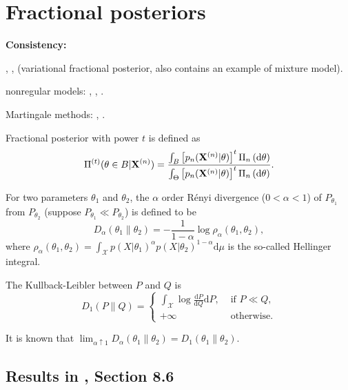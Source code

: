 \documentclass[11pt]{article}
\theoremstyle{plain}
\theoremstyle{definition}
\theoremstyle{remark}
\begin{document}
\section{Fractional posteriors}
\textbf{Consistency:}

\cite{kar10563}, \cite{Bha2016}, \cite{Alquier2017a} (variational fractional posterior, also contains an example of mixture model).

nonregular models: \cite{Ghosal1995}, \cite{Dudley2002}, \cite{Bochkina2014}.

Martingale methods: \cite{walker2004new}, \cite{Walker2007}.


Fractional posterior with power $t$ is defined as
\begin{align*}
    \Pi^{(t)}( \theta \in B | \mathbf{X}^{(n)} )
    =
    \frac{
        \int_{B} \left[ p_n ( \mathbf{X}^{(n)} | \theta ) \right]^t \Pi_n \left( \mathrm d \theta \right)
    }{
        \int_{\Theta} \left[ p_n ( \mathbf{X}^{(n)} | \theta ) \right]^t \Pi_n\left( \mathrm d \theta \right)
    }.
\end{align*}


For two parameters $\theta_1$ and $\theta_2$, the $\alpha$ order R\'enyi divergence ($0< \alpha <1$) of $P_{\theta_1}$ from $P_{\theta_2}$ (suppose $P_{\theta_1} \ll P_{\theta_2}$) is defined to be
\begin{equation*}
    D_{\alpha}(\theta_1 \| \theta_2) = - \frac{1}{1-\alpha} \log \rho_\alpha (\theta_1,\theta_2),
\end{equation*}
where $\rho_\alpha (\theta_1, \theta_2)= \int_{\mathcal X} p(X|\theta_1)^\alpha p(X|\theta_2)^{1-\alpha} \mathrm d \mu$ is the so-called Hellinger integral.

 The Kullback-Leibler between $P$ and $Q$ is
\begin{equation*}
    D_1 (P \| Q) =
   \left\{ 
       \begin{array}{ll}
       \int_{\mathcal X} \log \frac{\mathrm d P}{\mathrm d Q}  \mathrm d P,
           & \text{ if $P \ll Q$,}\\ 
           + \infty & \text{ otherwise.}
       \end{array}
\right.
\end{equation*}

It is known that $\lim_{\alpha  \uparrow 1} D_{\alpha} (\theta_1 \| \theta_2) = D_1 (\theta_1 \| \theta_2)$.



\subsection{Results in \cite{Subhashis2017Fundamentals}, Section 8.6}
\end{document}
